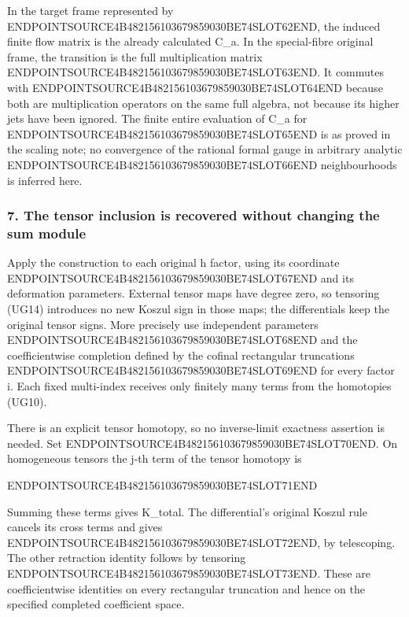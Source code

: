 In the target frame represented by ENDPOINTSOURCE4B482156103679859030BE74SLOT62END, the induced finite flow matrix is the already calculated C\_a. In the special-fibre original frame, the transition is the full multiplication matrix ENDPOINTSOURCE4B482156103679859030BE74SLOT63END. It commutes with ENDPOINTSOURCE4B482156103679859030BE74SLOT64END because both are multiplication operators on the same full algebra, not because its higher jets have been ignored. The finite entire evaluation of C\_a for ENDPOINTSOURCE4B482156103679859030BE74SLOT65END is as proved in the scaling note; no convergence of the rational formal gauge in arbitrary analytic ENDPOINTSOURCE4B482156103679859030BE74SLOT66END neighbourhoods is inferred here.

\subsubsection{7. The tensor inclusion is recovered without changing the sum module}\label{endpoint-f1_unit_gauge--the-tensor-inclusion-is-recovered-without-changing-the-sum-module}

Apply the construction to each original h factor, using its coordinate ENDPOINTSOURCE4B482156103679859030BE74SLOT67END and its deformation parameters. External tensor maps have degree zero, so tensoring (UG14) introduces no new Koszul sign in those maps; the differentials keep the original tensor signs. More precisely use independent parameters ENDPOINTSOURCE4B482156103679859030BE74SLOT68END and the coefficientwise completion defined by the cofinal rectangular truncations ENDPOINTSOURCE4B482156103679859030BE74SLOT69END for every factor i. Each fixed multi-index receives only finitely many terms from the homotopies (UG10).

There is an explicit tensor homotopy, so no inverse-limit exactness assertion is needed. Set ENDPOINTSOURCE4B482156103679859030BE74SLOT70END. On homogeneous tensors the j-th term of the tensor homotopy is

ENDPOINTSOURCE4B482156103679859030BE74SLOT71END

Summing these terms gives K\_total. The differential's original Koszul rule cancels its cross terms and gives ENDPOINTSOURCE4B482156103679859030BE74SLOT72END, by telescoping. The other retraction identity follows by tensoring ENDPOINTSOURCE4B482156103679859030BE74SLOT73END. These are coefficientwise identities on every rectangular truncation and hence on the specified completed coefficient space.

